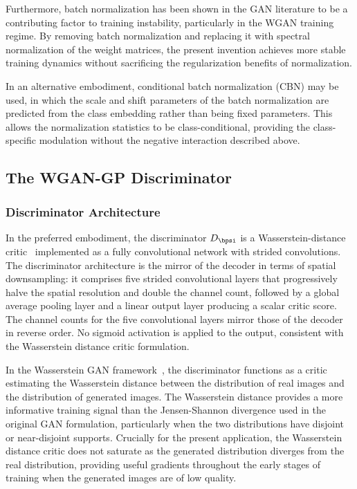 \documentclass[12pt,letterpaper]{article}
\begin{document}
Furthermore, batch normalization has been shown in the GAN literature to be a
contributing factor to training instability, particularly in the WGAN training
regime. By removing batch normalization and replacing it with spectral
normalization of the weight matrices, the present invention achieves more
stable training dynamics without sacrificing the regularization benefits of
normalization.

In an alternative embodiment, conditional batch normalization (CBN) may be
used, in which the scale and shift parameters of the batch normalization are
predicted from the class embedding rather than being fixed parameters. This
allows the normalization statistics to be class-conditional, providing the
class-specific modulation without the negative interaction described above.

\subsection{The WGAN-GP Discriminator}

\subsubsection{Discriminator Architecture}

In the preferred embodiment, the discriminator $D_{\bpsi}$ is a
Wasserstein-distance critic~\cite{arjovsky2017,gulrajani2017} implemented as
a fully convolutional network with strided convolutions. The discriminator
architecture is the mirror of the decoder in terms of spatial downsampling: it
comprises five strided convolutional layers that progressively halve the spatial
resolution and double the channel count, followed by a global average pooling
layer and a linear output layer producing a scalar critic score. The channel
counts for the five convolutional layers mirror those of the decoder in reverse
order. No sigmoid activation is applied to the output, consistent with the
Wasserstein distance critic formulation.

In the Wasserstein GAN framework~\cite{arjovsky2017}, the discriminator
functions as a critic estimating the Wasserstein distance between the
distribution of real images and the distribution of generated images. The
Wasserstein distance provides a more informative training signal than the
Jensen-Shannon divergence used in the original GAN formulation, particularly
when the two distributions have disjoint or near-disjoint supports. Crucially
for the present application, the Wasserstein distance critic does not saturate
as the generated distribution diverges from the real distribution, providing
useful gradients throughout the early stages of training when the generated
images are of low quality.
\end{document}
